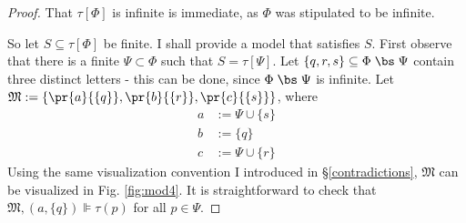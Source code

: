 \begin{proof}
That $\tau[\Phi]$ is infinite is immediate, as $\Phi$ was stipulated to be infinite. 

So let $S\subseteq \tau[\Phi]$ be finite.  I shall provide a model that
satisfies $S$.  First observe that there is a
 finite $\Psi\subset
\Phi$ such that $S = \tau[\Psi]$.  Let $\{q,r,s\} \subseteq \Phi \; \bs
\; \Psi$ contain
 three distinct letters - this can be done, since $\Phi \;
\bs \; \Psi$ is infinite.
  Let $\mathfrak{M} := \{\pr{a}{\{q\}},
\pr{b}{\{r\}}, \pr{c}{\{s\}} \}$, where 
\begin{align*}
a & := \Psi \cup \{s\} \\
b & := \{q \} \\
c & := \Psi \cup \{r\}
\end{align*}
 Using the same visualization convention I introduced in \S\ref{contradictions},
 $\mathfrak{M}$ can  be visualized%
in Fig. \ref{fig:mod4}.  It is straightforward to 
check that $\mathfrak{M},( a,\{q\}) \VDash \tau(p)$ for all $p \in \Psi$.


\end{proof}
